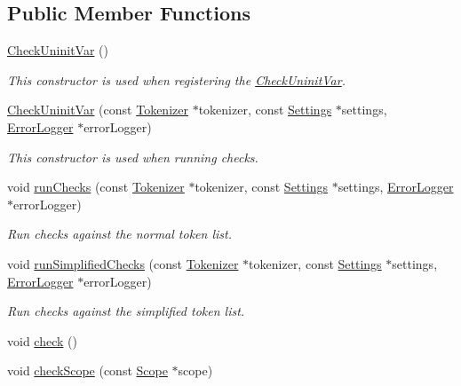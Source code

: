 \subsection*{Public Member Functions}
\begin{DoxyCompactItemize}
\item 
\hyperlink{class_check_uninit_var_a5793c0925110603fc547570147c748a0}{Check\-Uninit\-Var} ()
\begin{DoxyCompactList}\small\item\em This constructor is used when registering the \hyperlink{class_check_uninit_var}{Check\-Uninit\-Var}. \end{DoxyCompactList}\item 
\hyperlink{class_check_uninit_var_ab4a2745df772d7c1df61b8f714250b94}{Check\-Uninit\-Var} (const \hyperlink{class_tokenizer}{Tokenizer} $\ast$tokenizer, const \hyperlink{class_settings}{Settings} $\ast$settings, \hyperlink{class_error_logger}{Error\-Logger} $\ast$error\-Logger)
\begin{DoxyCompactList}\small\item\em This constructor is used when running checks. \end{DoxyCompactList}\item 
void \hyperlink{class_check_uninit_var_afc2d2c146e3c2048acb0fba3427e4dc1}{run\-Checks} (const \hyperlink{class_tokenizer}{Tokenizer} $\ast$tokenizer, const \hyperlink{class_settings}{Settings} $\ast$settings, \hyperlink{class_error_logger}{Error\-Logger} $\ast$error\-Logger)
\begin{DoxyCompactList}\small\item\em Run checks against the normal token list. \end{DoxyCompactList}\item 
void \hyperlink{class_check_uninit_var_a4497e740ca408945fb0ef3f711cd5f43}{run\-Simplified\-Checks} (const \hyperlink{class_tokenizer}{Tokenizer} $\ast$tokenizer, const \hyperlink{class_settings}{Settings} $\ast$settings, \hyperlink{class_error_logger}{Error\-Logger} $\ast$error\-Logger)
\begin{DoxyCompactList}\small\item\em Run checks against the simplified token list. \end{DoxyCompactList}\item 
void \hyperlink{class_check_uninit_var_a2ecdad32c82088a40e73b19bec5a7554}{check} ()
\item 
void \hyperlink{class_check_uninit_var_a7513784685282a7aeaacb3f4f89d61e4}{check\-Scope} (const \hyperlink{class_scope}{Scope} $\ast$scope)

\end{DoxyCompactItemize}
